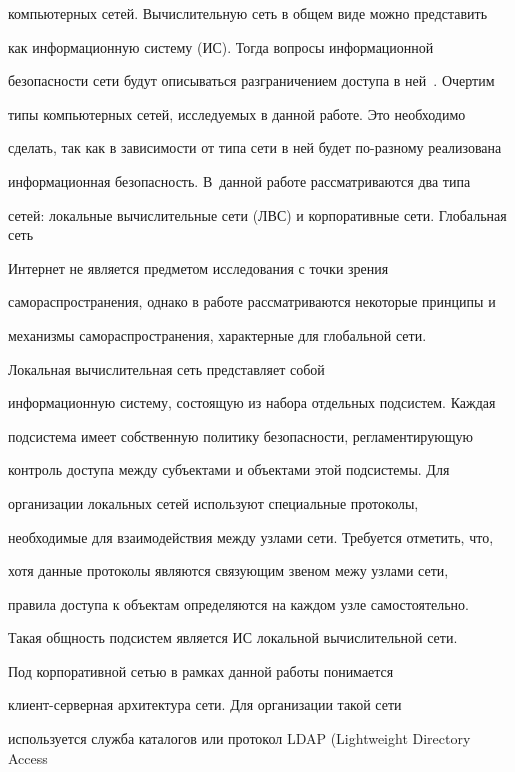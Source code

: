 компьютерных сетей. Вычислительную сеть в общем виде можно представить 


как информационную систему (ИС). Тогда вопросы информационной 


безопасности сети будут описываться разграничением доступа в ней~\cite{2-lev}. Очертим 


типы компьютерных сетей, исследуемых в данной работе. Это необходимо 


сделать, так как в зависимости от типа сети в ней будет по-разному реализована 


информационная безопасность. В~данной работе рассматриваются два типа 


сетей: локальные вычислительные сети (ЛВС) и корпоративные сети. Глобальная сеть 


Интернет не является предметом исследования с точки зрения 


самораспространения, однако в работе рассматриваются некоторые принципы и 


механизмы самораспространения, характерные для глобальной сети. 


     


     Локальная вычислительная сеть представляет собой 


информационную сис\-те\-му, состоящую из набора отдельных под\-сис\-тем. Каждая 


подсистема имеет собственную политику безопасности, регламентирующую 


контроль доступа между субъектами и объектами этой подсистемы. Для 


организации локальных сетей используют специальные протоколы, 


необходимые для взаимодействия между узлами сети. Требуется отметить, что, 


хотя данные протоколы являются связующим звеном межу узлами сети, 


правила доступа к объектам определяются на каждом узле самостоятельно. 


Такая общность подсистем является ИС локальной вычислительной сети. 


     


     Под корпоративной сетью в рамках данной работы понимается 


     кли\-ент-сер\-вер\-ная архитектура сети. Для организации такой сети 


используется служба каталогов или протокол LDAP (Lightweight Directory Access


